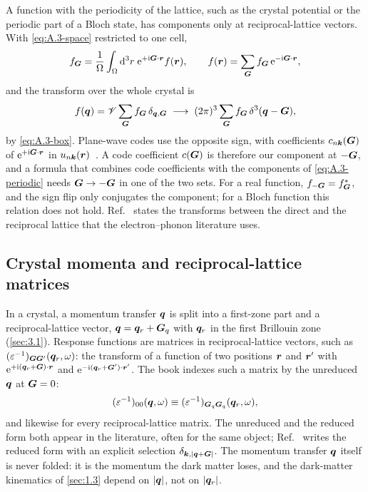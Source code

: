 A function with the periodicity of the lattice, such as the crystal potential or the periodic part of a Bloch state, has components only at reciprocal-lattice vectors. With \cref{eq:A.3-space} restricted to one cell,
\begin{equation}
  f_{\bm{G}} = \frac{1}{\Omega}\int_\Omega\mathrm{d}^3r\;\mathrm{e}^{+\mathrm{i}\bm{G}\cdot\bm{r}}f(\bm{r}), \qquad
  f(\bm{r}) = \sum_{\bm{G}} f_{\bm{G}}\,\mathrm{e}^{-\mathrm{i}\bm{G}\cdot\bm{r}},
  \label{eq:A.3-periodic}
\end{equation}
and the transform over the whole crystal is
\begin{equation*}
  f(\bm{q}) = \mathscr{V}\sum_{\bm{G}}f_{\bm{G}}\,\delta_{\bm{q},\bm{G}} \;\longrightarrow\; (2\pi)^3\sum_{\bm{G}}f_{\bm{G}}\,\delta^3(\bm{q} - \bm{G}) ,
\end{equation*}
by \cref{eq:A.3-box}. Plane-wave codes use the opposite sign, with coefficients $c_{n\bm{k}}(\bm{G})$ of $\mathrm{e}^{+\mathrm{i}\bm{G}\cdot\bm{r}}$ in $u_{n\bm{k}}(\bm{r})$~\cite[Eq.~(3.14)]{essig2016direct}. A code coefficient $c(\bm{G})$ is therefore our component at $-\bm{G}$, and a formula that combines code coefficients with the components of \cref{eq:A.3-periodic} needs $\bm{G} \to -\bm{G}$ in one of the two sets. For a real function, $f_{-\bm{G}} = f_{\bm{G}}^*$, and the sign flip only conjugates the component; for a Bloch function this relation does not hold. Ref.~\cite[Appendix~A]{giustino2017electron} states the transforms between the direct and the reciprocal lattice that the electron--phonon literature uses.

\subsection{Crystal momenta and reciprocal-lattice matrices}

In a crystal, a momentum transfer $\bm{q}$ is split into a first-zone part and a reciprocal-lattice vector, $\bm{q} = \bm{q}_r + \bm{G}_q$ with $\bm{q}_r$ in the first Brillouin zone (\cref{sec:3.1}). Response functions are matrices in reciprocal-lattice vectors, such as $(\varepsilon^{-1})_{\bm{G}\bm{G}'}(\bm{q}_r,\omega)$: the transform of a function of two positions $\bm{r}$ and $\bm{r}'$ with $\mathrm{e}^{+\mathrm{i}(\bm{q}_r+\bm{G})\cdot\bm{r}}$ and $\mathrm{e}^{-\mathrm{i}(\bm{q}_r+\bm{G}')\cdot\bm{r}'}$. The book indexes such a matrix by the unreduced $\bm{q}$ at $\bm{G} = 0$:
\begin{equation}
  (\varepsilon^{-1})_{00}(\bm{q},\omega) \equiv (\varepsilon^{-1})_{\bm{G}_q\bm{G}_q}(\bm{q}_r,\omega),
  \label{eq:A.3-unreduced}
\end{equation}
and likewise for every reciprocal-lattice matrix. The unreduced and the reduced form both appear in the literature, often for the same object; Ref.~\cite[Eq.~(24)]{knapen2021dark} writes the reduced form with an explicit selection $\delta_{\bm{k},|\bm{q}+\bm{G}|}$. The momentum transfer $\bm{q}$ itself is never folded: it is the momentum the dark matter loses, and the dark-matter kinematics of \cref{sec:1.3} depend on $|\bm{q}|$, not on $|\bm{q}_r|$.

